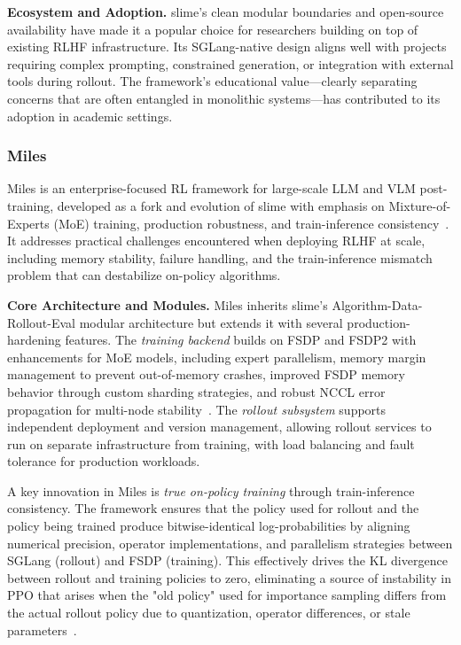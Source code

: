 \documentclass[conference]{IEEEtran}
\begin{document}
\textbf{Ecosystem and Adoption.} slime's clean modular boundaries and open-source availability have made it a popular choice for researchers building on top of existing RLHF infrastructure. Its SGLang-native design aligns well with projects requiring complex prompting, constrained generation, or integration with external tools during rollout. The framework's educational value—clearly separating concerns that are often entangled in monolithic systems—has contributed to its adoption in academic settings.


\subsubsection{Miles}

Miles is an enterprise-focused RL framework for large-scale LLM and VLM post-training, developed as a fork and evolution of slime with emphasis on Mixture-of-Experts (MoE) training, production robustness, and train-inference consistency~\cite{miles-blog, miles-github}. It addresses practical challenges encountered when deploying RLHF at scale, including memory stability, failure handling, and the train-inference mismatch problem that can destabilize on-policy algorithms.

\textbf{Core Architecture and Modules.} Miles inherits slime's Algorithm-Data-Rollout-Eval modular architecture but extends it with several production-hardening features. The \textit{training backend} builds on FSDP and FSDP2 with enhancements for MoE models, including expert parallelism, memory margin management to prevent out-of-memory crashes, improved FSDP memory behavior through custom sharding strategies, and robust NCCL error propagation for multi-node stability~\cite{miles-blog}. The \textit{rollout subsystem} supports independent deployment and version management, allowing rollout services to run on separate infrastructure from training, with load balancing and fault tolerance for production workloads.

A key innovation in Miles is \textit{true on-policy training} through train-inference consistency. The framework ensures that the policy used for rollout and the policy being trained produce bitwise-identical log-probabilities by aligning numerical precision, operator implementations, and parallelism strategies between SGLang (rollout) and FSDP (training). This effectively drives the KL divergence between rollout and training policies to zero, eliminating a source of instability in PPO that arises when the "old policy" used for importance sampling differs from the actual rollout policy due to quantization, operator differences, or stale parameters~\cite{miles-blog}.
\end{document}
